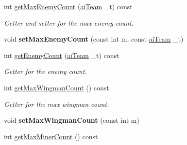 \begin{DoxyCompactItemize}
\item 
\hypertarget{classuniverse_a618ef9595ad161031dacb3909a694330}{int \hyperlink{classuniverse_a618ef9595ad161031dacb3909a694330}{get\-Max\-Enemy\-Count} (\hyperlink{enemy_8hpp_abac1fdbabb5a6be5f0d6ae40be5c5a58}{ai\-Team} \-\_\-t) const }\label{classuniverse_a618ef9595ad161031dacb3909a694330}

\begin{DoxyCompactList}\small\item\em Getter and setter for the max enemy count. \end{DoxyCompactList}\item 
\hypertarget{classuniverse_a70b6a09e9fa7a93b65f1d6182f86181e}{void {\bfseries set\-Max\-Enemy\-Count} (const int m, const \hyperlink{enemy_8hpp_abac1fdbabb5a6be5f0d6ae40be5c5a58}{ai\-Team} \-\_\-t)}\label{classuniverse_a70b6a09e9fa7a93b65f1d6182f86181e}

\item 
\hypertarget{classuniverse_a02a9b87c10d761ba90bddcba429c8840}{int \hyperlink{classuniverse_a02a9b87c10d761ba90bddcba429c8840}{get\-Enemy\-Count} (\hyperlink{enemy_8hpp_abac1fdbabb5a6be5f0d6ae40be5c5a58}{ai\-Team} \-\_\-t) const }\label{classuniverse_a02a9b87c10d761ba90bddcba429c8840}

\begin{DoxyCompactList}\small\item\em Getter for the enemy count. \end{DoxyCompactList}\item 
\hypertarget{classuniverse_a2f92ca94b16cb4734cc51b673488cd0d}{int \hyperlink{classuniverse_a2f92ca94b16cb4734cc51b673488cd0d}{get\-Max\-Wingman\-Count} () const }\label{classuniverse_a2f92ca94b16cb4734cc51b673488cd0d}

\begin{DoxyCompactList}\small\item\em Getter for the max wingman count. \end{DoxyCompactList}\item 
\hypertarget{classuniverse_a200ab28e86c28228088919c3e667d90d}{void {\bfseries set\-Max\-Wingman\-Count} (const int m)}\label{classuniverse_a200ab28e86c28228088919c3e667d90d}

\item 
\hypertarget{classuniverse_a6889a4cb6b8aaecd6c8abe363c8a80ec}{int \hyperlink{classuniverse_a6889a4cb6b8aaecd6c8abe363c8a80ec}{get\-Max\-Miner\-Count} () const }\label{classuniverse_a6889a4cb6b8aaecd6c8abe363c8a80ec}


\end{DoxyCompactItemize}
